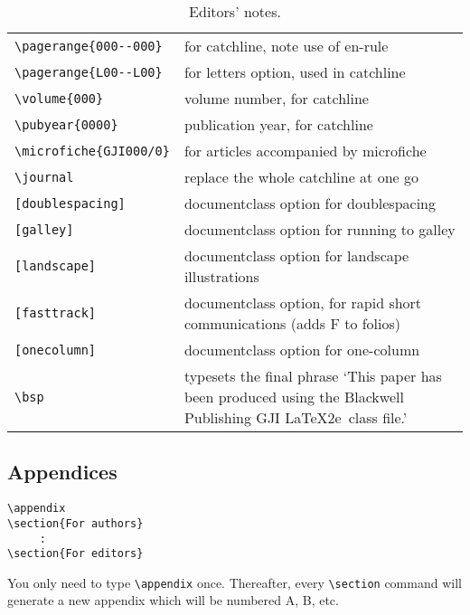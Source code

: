\begin{table*}
\begin{minipage}{130mm}
\caption{Editors' notes.}\label{editors}
\begin{tabular}{@{}lp{270pt}}
\verb"\pagerange{000--000}"& for catchline, note use of en-rule\\
\verb"\pagerange{L00--L00}"& for letters option, used in catchline\\
\verb"\volume{000}" & volume number, for catchline\\
\verb"\pubyear{0000}" & publication year, for catchline\\
\verb"\microfiche{GJI000/0}" & for articles accompanied by microfiche\\
\verb"\journal" & replace the whole catchline at one go\\
\verb"[doublespacing]" & documentclass option for doublespacing\\
\verb"[galley]" & documentclass option for running to galley\\
\verb"[landscape]" & documentclass option for landscape illustrations\\
\verb"[fasttrack]" & documentclass option, for rapid short communications
                   (adds F to folios)\\
\verb"[onecolumn]" & documentclass option for one-column \\
\verb"\bsp"& typesets the final phrase `This paper has been produced
 using the Blackwell Publishing GJI \LaTeX2e\ class file.'\\
\end{tabular}
\end{minipage}
\end{table*}

\subsection{Appendices}

\begin{verbatim}
\appendix
\section{For authors}
     :
\section{For editors}
\end{verbatim}
You only need to type \verb"\appendix" once. Thereafter, every \verb"\section"
command will generate a new appendix which will be numbered A, B, etc.

